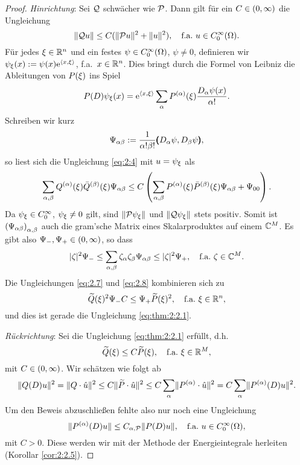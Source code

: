 \begin{proof}
{\em Hinrichtung}:
Sei $\mathcal Q$ schwächer wie $\mathcal P$.
Dann gilt für ein $C\in(0,\infty)$ die Ungleichung
\begin{equation}\label{eq:2:4}
\lVert\mathcal Q u\rVert\leq C(\lVert\mathcal P u\rVert^2+\lVert u\rVert^2),\quad\text{f.a.}~u\in C^\infty_0(\Omega).
\end{equation}
Für jedes $\xi\in\mathbb R^n$ und ein festes $\psi\in C^\infty_0(\Omega)$, $\psi\neq0$,
definieren wir $\psi_\xi(x):=\psi(x)\mathrm e^{\langle x,\xi\rangle}$, f.a.~$x\in\mathbb R^n$.
Dies bringt durch die Formel von Leibniz die Ableitungen von $P(\xi)$ ins Spiel
\begin{equation}\label{eq:2.5}
P(D)\psi_\xi(x)=\mathrm e^{\langle x,\xi\rangle}\sum_\alpha P^{(\alpha)}(\xi)\frac{D_\alpha\psi(x)}{\alpha!}.
\end{equation}
Schreiben wir kurz
\begin{equation}\label{eq:2.6}
\Psi_{\alpha\beta}:=\frac1{\alpha!\beta!}\pmb(D_\alpha\psi,D_\beta\psi\pmb),
\end{equation}
so liest sich die Ungleichung \eqref{eq:2:4} mit $u=\psi_\xi$ als
\begin{equation}\label{eq:2.7}
\sum_{\alpha,\beta}Q^{(\alpha)}(\xi)\bar{Q}^{(\beta)}(\xi)\Psi_{\alpha\beta}
\leq C\left(\sum_{\alpha,\beta}P^{(\alpha)}(\xi)\bar{P}^{(\beta)}(\xi)\Psi_{\alpha\beta}+\Psi_{00}\right).
\end{equation}
Da $\psi_\xi\in C^\infty_0$, $\psi_\xi\neq0$ gilt, sind $\lVert\mathcal P\psi_\xi\rVert$ und $\lVert\mathcal Q\psi_\xi\rVert$ stets positiv.
Somit ist $\left(\Psi_{\alpha\beta}\right)_{\alpha,\beta}$ auch die gram'sche Matrix
eines Skalarproduktes auf einem $\mathbb C^M$.
Es gibt also $\Psi_-,\Psi_+\in(0,\infty)$, so dass
\begin{equation}\label{eq:2.8}
\lvert\zeta\rvert^2\Psi_-\leq\sum_{\alpha,\beta}\zeta_\alpha\zeta_\beta\Psi_{\alpha\beta}\leq\lvert\zeta\rvert^2\Psi_+,
\quad\text{f.a.}~\zeta\in\mathbb C^M.
\end{equation}
Die Ungleichungen \eqref{eq:2.7} und \eqref{eq:2.8} kombinieren sich zu
\begin{equation}\label{eq:2.9}
\widetilde{Q}(\xi)^2\Psi_-C\leq\Psi_+\widetilde{P}(\xi)^2,
\quad\text{f.a.}~\xi\in\mathbb R^n,
\end{equation}
und dies ist gerade die Ungleichung \eqref{eq:thm:2:2.1}.

{\em Rückrichtung}:
Sei die Ungleichung \eqref{eq:thm:2:2.1} erfüllt, d.h.
\begin{equation}\label{eq:2.10}
\widetilde{Q}(\xi)\leq C\widetilde{P}(\xi),
\quad\text{f.a.}~\xi\in\mathbb R^M,
\end{equation}
mit $C\in(0,\infty)$.
Wir schätzen wie folgt ab
\begin{equation}\label{eq:2.11}
\lVert Q(D)u\rVert^2=\lVert Q\cdot\hat{u}\rVert^2\leq C\lVert\widetilde{P}\cdot\hat{u}\rVert^2
\leq C\sum_{\alpha}\lVert P^{(\alpha)}\cdot\hat{u}\rVert^2=C\sum_\alpha\lVert P^{(\alpha)}(D)u\rVert^2.
\end{equation}
Um den Beweis abzuschließen fehlte also nur noch eine Ungleichung
\begin{equation}
\lVert P^{(\alpha)}(D)u\rVert\leq C_{\alpha,\mathcal P}\lVert P(D)u\rVert,
\quad\text{f.a.}~u\in C^\infty_0(\Omega),
\end{equation}
mit $C>0$.
Diese werden wir mit der Methode der Energieintegrale herleiten (Korollar \ref{cor:2:2.5}).
\end{proof}

